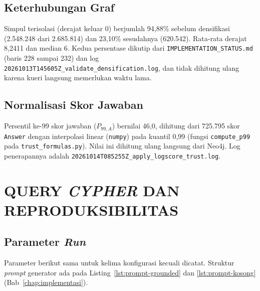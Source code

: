 \section{Keterhubungan Graf}
\label{sec:lamp-kg-isolasi}

Simpul terisolasi (derajat keluar 0) berjumlah 94,88\% sebelum densifikasi (2.548.248 dari 2.685.814) dan 23,10\% sesudahnya (620.542). Rata-rata derajat 8,2411 dan median 6. Kedua persentase dikutip dari \texttt{IMPLEMENTATION\_\allowbreak{}STATUS.\allowbreak{}md} (baris 228 sampai 232) dan log \texttt{20261013T145605Z\_\allowbreak{}validate\_\allowbreak{}densification.\allowbreak{}log}, dan tidak dihitung ulang karena kueri langsung memerlukan waktu lama.

\section{Normalisasi Skor Jawaban}
\label{sec:lamp-kg-p99}

Persentil ke-99 skor jawaban ($P_{99,A}$) bernilai 46,0, dihitung dari 725.795 skor \texttt{Answer} dengan interpolasi linear (\texttt{numpy}) pada kuantil 0,99 (fungsi \texttt{compute\_p99} pada \texttt{trust\_\allowbreak{}formulas.\allowbreak{}py}). Nilai ini dihitung ulang langsung dari Neo4j. Log penerapannya adalah \texttt{20261014T085255Z\_\allowbreak{}apply\_\allowbreak{}logscore\_\allowbreak{}trust.\allowbreak{}log}.


\cleardoublepage
\chapter{QUERY \textit{CYPHER} DAN REPRODUKSIBILITAS}
\label{lamp:repro}

\section{Parameter \emph{Run}}
\label{sec:lamp-d-param}

Parameter berikut sama untuk kelima konfigurasi kecuali dicatat. Struktur \emph{prompt} generator ada pada Listing~\ref{lst:prompt-grounded} dan \ref{lst:prompt-kosong} (Bab~\ref{chap:implementasi}).

